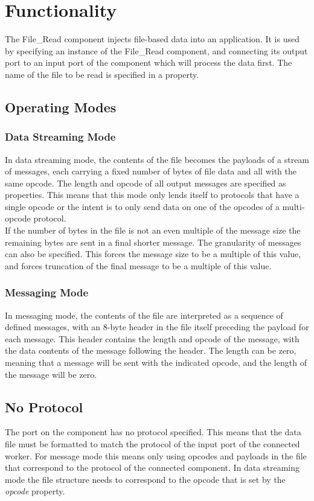 \documentclass{article}
\begin{document}
\section*{Functionality}
\begin{flushleft}
The File\_Read component injects file-based data into an application. It is used
by specifying an instance of the File\_Read component, and connecting its output port to
an input port of the component which will process the data first. The name of the file to
be read is specified in a property.
\subsection*{Operating Modes}
\subsubsection*{Data Streaming Mode}
In data streaming mode, the contents of the file becomes the payloads of a stream of
messages, each carrying a fixed number of bytes of file data and all with
the same opcode. The length and opcode of all output messages are specified as
properties. This means that this mode only lends itself to protocols that have a single opcode or the intent is to only send data on one of the opcodes of a multi-opcode protocol.\\ \medskip \medskip
If the number of bytes in the file is not an even multiple of the message size the
remaining bytes are sent in a final shorter message. The granularity of messages can
also be specified. This forces the message size to be a multiple of this value, and
forces truncation of the final message to be a multiple of this value.
\newpage
\subsubsection*{Messaging Mode}
In messaging mode, the contents of the file are interpreted as a sequence of defined
messages, with an 8-byte header in the file itself preceding the payload for each message.
This header contains the length and opcode of the message, with the data contents of
the message following the header. The length can be zero, meaning that a message
will be sent with the indicated opcode, and the length of the message will be zero.\\
\medskip \medskip

\subsection*{No Protocol}
The port on the component has no protocol specified.  This means that the data file must be formatted to match the protocol of the input port of the connected worker.  For message mode this means only using opcodes and payloads in the file that correspond to the protocol of the connected component.  In data streaming mode the file structure needs to correspond to the opcode that is set by the \textit{opcode} property.

\end{flushleft}
\end{document}
